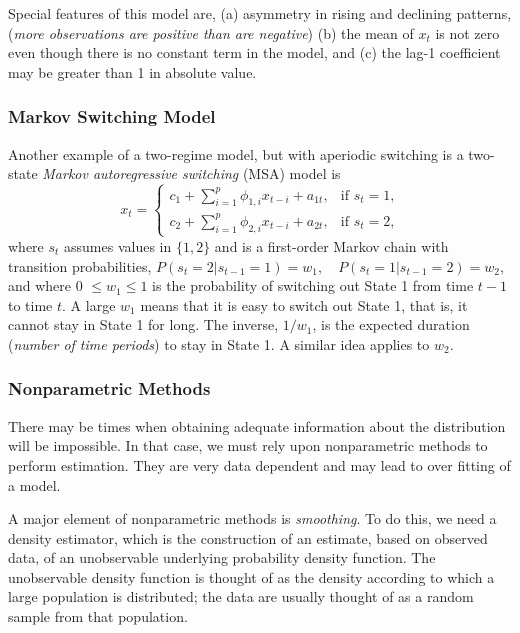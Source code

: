 Special features of this model are,  (a) asymmetry in rising and declining 
patterns, (\textit{more observations are positive than are negative}) (b) the mean of $x_t$ is not zero even though there is no constant term in the model, and (c) the lag-1 coefficient may be greater than 1 in absolute value.

\subsubsection{Markov Switching Model}
Another example of a two-regime model, but with aperiodic switching is a two-state \emph{Markov autoregressive switching} (MSA) model is
\begin{equation}
x_t = 
\begin{cases}
c_1 + \sum^p_{i=1} \phi_{1,i} x_{t-i} + a_{1t}, &\text{if $s_t=1$,} \\
c_2 + \sum^p_{i=1} \phi_{2,i} x_{t-i} + a_{2t}, &\text{if $s_t=2$,}
\end{cases}
\end{equation} 
where $s_t$ assumes values in $\{1,2\}$ and is a first-order Markov chain 
with transition probabilities,
$P(s_t=2|s_{t-1}=1)=w_1, \quad P(s_t=1|s_{t-1}=2)=w_2,$
and where 0 $\le w_1 \le 1$ is the probability of switching out State 1 from 
time $t-1$ to time $t$. A large $w_1$ means that it is easy to switch out 
State 1, that is, it cannot stay in State 1 for long. The inverse, $1/w_1$, is 
the expected duration (\textit{number of time periods}) to stay in State 1. A similar idea applies to $w_2$. 



\subsubsection{Nonparametric Methods}
There may be times when obtaining adequate information about the distribution will be impossible. In that case, we must rely upon nonparametric methods to perform estimation. They are very data dependent and may lead to over fitting of a model.

A major element of nonparametric methods is \emph{smoothing}. To do this, we need a density estimator, which is the construction of an estimate, based on observed data, of an unobservable underlying probability density function. The unobservable density function is thought of as the density according to which a large population is distributed; the data are usually thought of as a random sample from that population.

